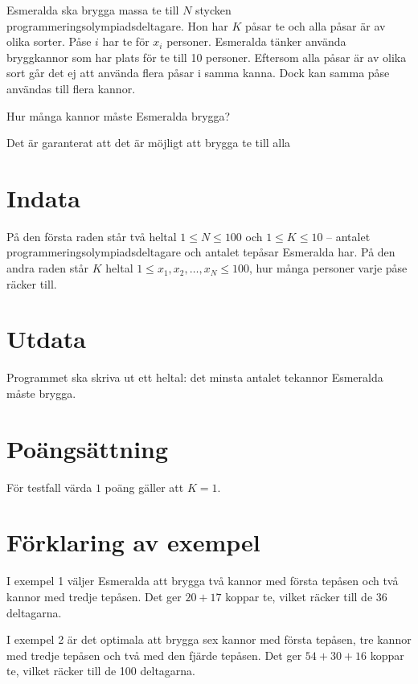 Esmeralda ska brygga massa te till $N$ stycken programmeringsolympiadsdeltagare.
Hon har $K$ påsar te och alla påsar är av olika sorter.
Påse $i$ har te för $x_i$ personer.
Esmeralda tänker använda bryggkannor som har plats för te till 10 personer.
Eftersom alla påsar är av olika sort
går det ej att använda flera påsar i samma kanna.
Dock kan samma påse användas till flera kannor.

Hur många kannor måste Esmeralda brygga?

Det är garanterat att det är möjligt att brygga te till alla

\section*{Indata}
På den första raden står två heltal $1 \le N \le 100$ och $1 \le K \le 10$
 -- antalet programmeringsolympiadsdeltagare och antalet tepåsar Esmeralda har.
På den andra raden står $K$ heltal $1 \le x_1, x_2, \dots, x_N \le 100$,
hur många personer varje påse räcker till.

\section*{Utdata}
Programmet ska skriva ut ett heltal: det minsta antalet tekannor Esmeralda måste brygga. 

\section*{Poängsättning}
För testfall värda $1$ poäng gäller att $K=1$.

\section*{Förklaring av exempel}
I exempel 1 väljer Esmeralda att brygga två kannor med första tepåsen 
och två kannor med tredje tepåsen. Det ger $20+17$ koppar te, vilket
räcker till de 36 deltagarna.

I exempel 2 är det optimala att brygga sex kannor med första tepåsen,
tre kannor med tredje tepåsen och två med den fjärde tepåsen.
Det ger $54+30+16$ koppar te, vilket räcker till de 100  deltagarna.